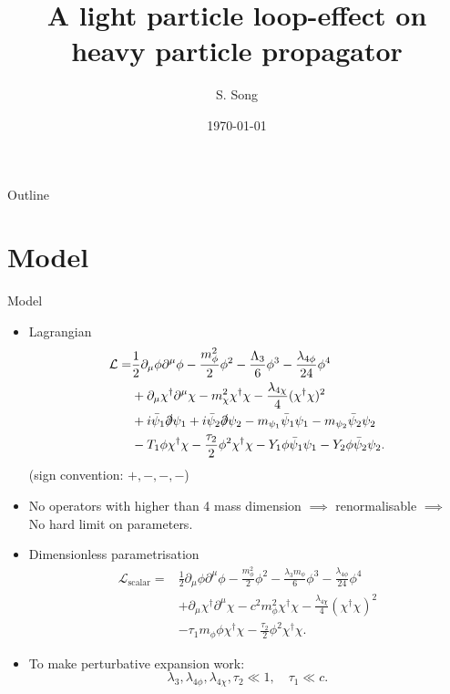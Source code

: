 \documentclass[10pt]{beamer}
\title{A light particle loop-effect on\\heavy particle propagator}
\author{S. Song}
\date{\today}
\begin{document}
	
	\begin{frame}
		\titlepage
	\end{frame}
	
	\begin{frame}{Outline}
		\tableofcontents
	\end{frame}
	
	\section{Model}
	\begin{frame}{Model}
		\begin{itemize}
			\item Lagrangian
			\begin{align*}
				\mathcal{L}=&\frac{1}{2}\partial_{\mu}\phi\partial^{\mu}\phi-\frac{m_{\phi}^{2}}{2}\phi^{2}-\frac{\Lambda_{3}}{6}\phi^{3}-\frac{\lambda_{4\phi}}{24}\phi^{4}\\
				&+\partial_{\mu}\chi^{\dagger}\partial^{\mu}\chi-m_{\chi}^{2}\chi^{\dagger}\chi-\frac{\lambda_{4\chi}}{4}(\chi^{\dagger}\chi)^{2}\\
				&+i\bar{\psi}_{1}\slashed{\partial}\psi_{1}+i\bar{\psi}_{2}\slashed{\partial}\psi_{2}-m_{\psi_{1}}\bar{\psi}_{1}\psi_{1}-m_{\psi_{2}}\bar{\psi}_{2}\psi_{2}\\
				&-T_{1}\phi\chi^{\dagger}\chi-\frac{\tau_{2}}{2}\phi^{2}\chi^{\dagger}\chi-Y_{1}\phi\bar{\psi}_{1}\psi_{1}-Y_{2}\phi\bar{\psi}_{2}\psi_{2}.
			\end{align*}
			(sign convention: $+,-,-,-$)
			
			\item No operators with higher than 4 mass dimension $\implies$ renormalisable $\implies$ No hard limit on parameters.
		\end{itemize}
	\end{frame}
	
	\begin{frame}
		\begin{itemize}
			\item Dimensionless parametrisation
			\begin{align*}
				\mathcal{L}_{\mathrm{scalar}}=&\frac{1}{2}\partial_{\mu}\phi\partial^{\mu}\phi-\frac{m_{\phi}^{2}}{2}\phi^{2}-\frac{\lambda_{3}m_{\phi}}{6}\phi^{3}-\frac{\lambda_{4\phi}}{24}\phi^{4}\\
				&+\partial_{\mu}\chi^{\dagger}\partial^{\mu}\chi-c^{2}m_{\phi}^{2}\chi^{\dagger}\chi-\frac{\lambda_{4\chi}}{4}(\chi^{\dagger}\chi)^{2}\\
				&-\tau_{1}m_{\phi}\phi\chi^{\dagger}\chi-\frac{\tau_{2}}{2}\phi^{2}\chi^{\dagger}\chi.
			\end{align*}
			
			\item To make perturbative expansion work:
			\[\lambda_{3},\lambda_{4\phi},\lambda_{4\chi},\tau_{2}\ll1,\quad\tau_{1}\ll c.\]
		\end{itemize}
	\end{frame}
	
\end{document}
